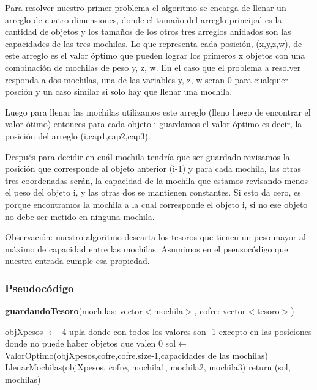 \documentclass[spanish,12pt]{article}
\begin{document}
{	Para resolver nuestro primer problema el algoritmo se encarga de llenar un arreglo de cuatro dimensiones, donde el tamaño del arreglo principal es la cantidad de objetos y los tamaños de los otros tres arreglos anidados son las capacidades de las tres mochilas.
	Lo que representa cada posición, (x,y,z,w), de este arreglo es el valor óptimo que pueden lograr los primeros x objetos con una combinación de mochilas de peso y, z, w. En el caso que el problema a resolver responda a dos mochilas, una de las variables y, z, w seran 0 para cualquier posción y un caso similar si solo hay que llenar una mochila.


	Luego para llenar las mochilas utilizamos este arreglo (lleno luego de encontrar el valor ótimo) entonces para cada objeto i guardamos el valor óptimo es decir, la posición del arreglo (i,cap1,cap2,cap3). 

	Después para decidir en cuál mochila tendría que ser guardado revisamos la posición que corresponde al objeto anterior (i-1) y para cada mochila, las otras tres coordenadas serán, la capacidad de la mochila que estamos revisando menos el peso del objeto i, y las otras dos se mantienen constantes. Si esto da cero, es porque encontramos la mochila a la cual corresponde el objeto i, si no ese objeto no debe ser metido en ninguna mochila. 


	Observación: nuestro algoritmo descarta los tesoros que tienen un peso mayor al máximo de capacidad entre las mochilas. Asumimos en el pseusocódigo que nuestra entrada cumple esa propiedad.


\subsubsection{Pseudocódigo}

\begin{algorithm}[H]{\textbf{guardandoTesoro}(mochilas: vector$<$mochila$>$, cofre: vector$<$tesoro$>$)}
	\begin{algorithmic}[1]
		\State objXpesos $\gets$ 4-upla donde con todos los valores son -1 excepto en las posiciones donde no puede haber objetos que valen  0 %
		\State sol$\gets$ ValorOptimo(objXpesos,cofre,cofre.size-1,capacidades de las mochilas)
		\State LlenarMochilas(objXpesos, cofre, mochila1, mochila2, mochila3)
		\State return (sol, mochilas)
	\end{algorithmic}
\end{algorithm}



}
\end{document}
